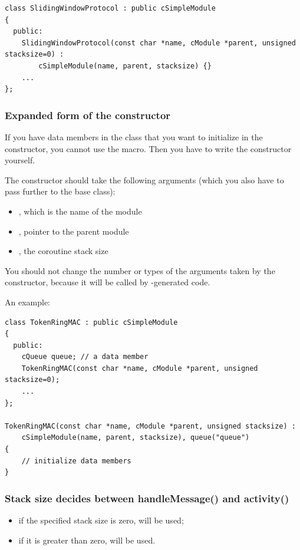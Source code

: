 \begin{verbatim}
class SlidingWindowProtocol : public cSimpleModule
{
  public:
    SlidingWindowProtocol(const char *name, cModule *parent, unsigned stacksize=0) :
        cSimpleModule(name, parent, stacksize) {}
    ...
};
\end{verbatim}

\subsubsection{Expanded form of the constructor}

If you have data members in the class that you want to initialize in the
constructor, you cannot use the  macro.
Then you have to write the constructor yourself.

The constructor should take the following
arguments (which you also have to pass further to the base class):

\begin{itemize}
  \item{, which is the name of the module}
  \item{, pointer to the parent module}
  \item{, the coroutine stack size}
\end{itemize}

You should not change the number or types of the arguments taken
by the constructor, because it will be called by {\opp}-generated
code.

An example:

\begin{verbatim}
class TokenRingMAC : public cSimpleModule
{
  public:
    cQueue queue; // a data member
    TokenRingMAC(const char *name, cModule *parent, unsigned stacksize=0);
    ...
};

TokenRingMAC(const char *name, cModule *parent, unsigned stacksize) :
    cSimpleModule(name, parent, stacksize), queue("queue")
{
    // initialize data members
}
\end{verbatim}


\subsubsection{Stack size decides between handleMessage() and activity()}

\begin{itemize}
\item{if the specified stack size is zero,  will be used;}
\item{if it is greater than zero,  will be used.}
\end{itemize}

